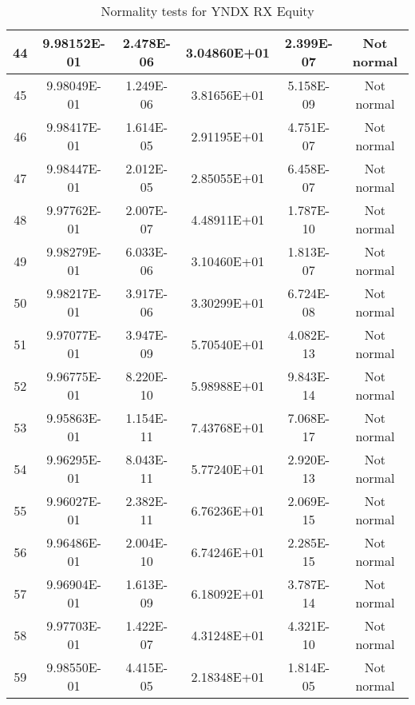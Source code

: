 \begin{table}[h]
\begin{tabular}{|c|c|c|c|c|c|}
		44 & 9.98152E-01 & 2.478E-06 & 3.04860E+01 & 2.399E-07 & Not normal\\\hline
		45 & 9.98049E-01 & 1.249E-06 & 3.81656E+01 & 5.158E-09 & Not normal\\\hline
		46 & 9.98417E-01 & 1.614E-05 & 2.91195E+01 & 4.751E-07 & Not normal\\\hline
		47 & 9.98447E-01 & 2.012E-05 & 2.85055E+01 & 6.458E-07 & Not normal\\\hline
		48 & 9.97762E-01 & 2.007E-07 & 4.48911E+01 & 1.787E-10 & Not normal\\\hline
		49 & 9.98279E-01 & 6.033E-06 & 3.10460E+01 & 1.813E-07 & Not normal\\\hline
		50 & 9.98217E-01 & 3.917E-06 & 3.30299E+01 & 6.724E-08 & Not normal\\\hline
		51 & 9.97077E-01 & 3.947E-09 & 5.70540E+01 & 4.082E-13 & Not normal\\\hline
		52 & 9.96775E-01 & 8.220E-10 & 5.98988E+01 & 9.843E-14 & Not normal\\\hline
		53 & 9.95863E-01 & 1.154E-11 & 7.43768E+01 & 7.068E-17 & Not normal\\\hline
		54 & 9.96295E-01 & 8.043E-11 & 5.77240E+01 & 2.920E-13 & Not normal\\\hline
		55 & 9.96027E-01 & 2.382E-11 & 6.76236E+01 & 2.069E-15 & Not normal\\\hline
		56 & 9.96486E-01 & 2.004E-10 & 6.74246E+01 & 2.285E-15 & Not normal\\\hline
		57 & 9.96904E-01 & 1.613E-09 & 6.18092E+01 & 3.787E-14 & Not normal\\\hline
		58 & 9.97703E-01 & 1.422E-07 & 4.31248E+01 & 4.321E-10 & Not normal\\\hline
		59 & 9.98550E-01 & 4.415E-05 & 2.18348E+01 & 1.814E-05 & Not normal\\\hline
	\end{tabular}
	\caption{Normality tests for YNDX RX Equity}
	\label{tab:normality_tests_YNDX_RX}
\end{table}
